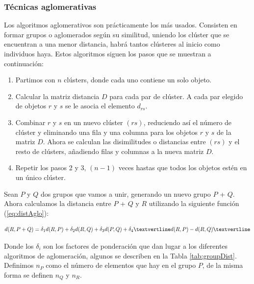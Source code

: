 \documentclass[a4paper, 20pt]{article}
\begin{document}
\subsubsection{Técnicas aglomerativas}
Los algoritmos aglomerativos son prácticamente los más usados. Consisten en formar grupos o aglomerados según su similitud, uniendo los clúster que se encuentran a una menor distancia, habrá tantos clústeres al inicio como individuos haya. Estos algoritmos siguen los pasos que se muestran a continuación:

\begin{enumerate}
	\item Partimos con $n$ clústers, donde cada uno contiene un solo objeto.
	\item Calcular la matriz distancia $D$ para cada par de clúster. A cada par elegido de objetos $r$ y $s$ se le asocia el elemento $d_{rs}$.
	\item Combinar $r$ y $s$ en un nuevo clúster $(rs)$, reduciendo así el número de clúster y eliminando una fila y una columna para los objetos $r$ y $s$ de la matriz $D$. Ahora se calculan las disimilitudes o distancias entre $(rs)$ y el resto de clústers, añadiendo filas y columnas a la nueva matriz $D$.
	\item Repetir los pasos 2 y 3, $(n-1)$ veces hastas que todos los objetos estén en un único clúster.
\end{enumerate}

Sean $P$ y $Q$ dos grupos que vamos a unir, generando un nuevo grupo $P$ + $Q$. Ahora calculamos la distancia entre $P$ + $Q$ y $R$ utilizando la siguiente función (\ref{eq:distAglo}):

\begin{equation}\label{eq:distAglo}
	d(R, P+Q) = \delta_1 d(R,P) + \delta_2 d(R,Q) + \delta_3 d(P,Q) + \delta_4 \textvertline d(R,P) - d(R,Q) \textvertline
\end{equation}

Donde los $\delta_i$ son los factores de ponderación que dan lugar a los diferentes algoritmos de aglomeración, algunos se describen en la Tabla \ref{tab:groupDist}. Definimos $n_P$ como el número de elementos que hay en el grupo $P$, de la misma forma se definen $n_Q$ y $n_R$.
\end{document}
